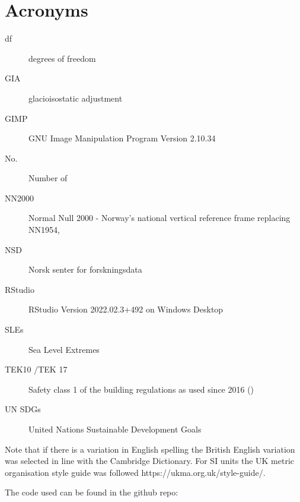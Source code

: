 
\chapter{Acronyms}
\begin{description}
\item[df]degrees of freedom
\item[GIA] glacioisostatic adjustment
\item[GIMP] GNU Image Manipulation Program Version 2.10.34
\item[No.] Number of
\item[NN2000] Normal Null 2000 - Norway's national vertical reference frame replacing NN1954, 
\item[NSD] Norsk senter for forskningsdata
\item [RStudio] RStudio Version 2022.02.3+492 on Windows Desktop
\item[SLEs] Sea Level Extremes
\item[TEK10 /TEK 17] Safety class 1 of the building regulations as used since 2016 (\cite{tides_high_2022})
\item [UN SDGs] United Nations Sustainable Development Goals 
\end{description}

Note that if there is a variation in English spelling the British English variation was selected in line with the Cambridge Dictionary. For SI units the UK metric organisation style guide was followed https://ukma.org.uk/style-guide/.  

The code used can be found in the github repo: 